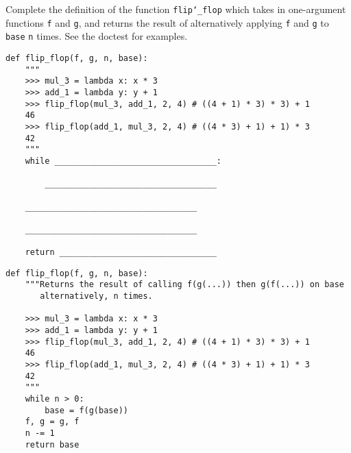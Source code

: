 \begin{blocksection}
\question Complete the definition of the function \texttt{flip\char`_flop} which takes in one-argument functions \texttt{f} and \texttt{g}, and returns the result of alternatively applying \texttt{f} and \texttt{g} to \texttt{base} \texttt{n} times. See the doctest for examples. \\

\begin{lstlisting}
def flip_flop(f, g, n, base):
    """
    >>> mul_3 = lambda x: x * 3
    >>> add_1 = lambda y: y + 1
    >>> flip_flop(mul_3, add_1, 2, 4) # ((4 + 1) * 3) * 3) + 1
    46
    >>> flip_flop(add_1, mul_3, 2, 4) # ((4 * 3) + 1) + 1) * 3
    42
    """
    while _________________________________:

        ___________________________________	

	___________________________________

	___________________________________

    return ________________________________
\end{lstlisting}

\begin{solution}
\begin{lstlisting}
def flip_flop(f, g, n, base):
    """Returns the result of calling f(g(...)) then g(f(...)) on base 
       alternatively, n times.
    
    >>> mul_3 = lambda x: x * 3
    >>> add_1 = lambda y: y + 1
    >>> flip_flop(mul_3, add_1, 2, 4) # ((4 + 1) * 3) * 3) + 1
    46
    >>> flip_flop(add_1, mul_3, 2, 4) # ((4 * 3) + 1) + 1) * 3
    42
    """
    while n > 0:	
        base = f(g(base))	
	f, g = g, f
	n -= 1	
    return base

\end{lstlisting}
\end{solution}
\end{blocksection}
